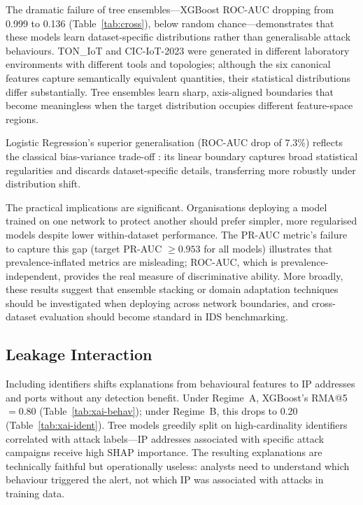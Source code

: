 \documentclass[12pt,a4paper]{report}
\begin{document}
The dramatic failure of tree ensembles---XGBoost ROC-AUC dropping from 0.999 to 0.136 (Table~\ref{tab:cross}), below random chance---demonstrates that these models learn dataset-specific distributions rather than generalisable attack behaviours. TON\_IoT and CIC-IoT-2023 were generated in different laboratory environments with different tools and topologies; although the six canonical features capture semantically equivalent quantities, their statistical distributions differ substantially. Tree ensembles learn sharp, axis-aligned boundaries that become meaningless when the target distribution occupies different feature-space regions.

Logistic Regression's superior generalisation (ROC-AUC drop of 7.3\%) reflects the classical bias-variance trade-off \cite{breiman2001}: its linear boundary captures broad statistical regularities and discards dataset-specific details, transferring more robustly under distribution shift.

The practical implications are significant. Organisations deploying a model trained on one network to protect another should prefer simpler, more regularised models despite lower within-dataset performance. The PR-AUC metric's failure to capture this gap (target PR-AUC $\geq 0.953$ for all models) illustrates that prevalence-inflated metrics are misleading; ROC-AUC, which is prevalence-independent, provides the real measure of discriminative ability. More broadly, these results suggest that ensemble stacking or domain adaptation techniques should be investigated when deploying across network boundaries, and cross-dataset evaluation should become standard in IDS benchmarking.

\subsection{Leakage Interaction}
\label{sec:disc-leakage}

Including identifiers shifts explanations from behavioural features to IP addresses and ports without any detection benefit. Under Regime~A, XGBoost's RMA@5 $= 0.80$ (Table~\ref{tab:xai-behav}); under Regime~B, this drops to 0.20 (Table~\ref{tab:xai-ident}). Tree models greedily split on high-cardinality identifiers correlated with attack labels---IP addresses associated with specific attack campaigns receive high SHAP importance. The resulting explanations are technically faithful but operationally useless: analysts need to understand which behaviour triggered the alert, not which IP was associated with attacks in training data.
\end{document}

